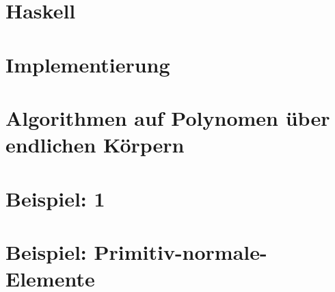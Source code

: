 \documentclass[ngerman
  ,fontsize=11pt %
  ,numbers=noenddot %
  ,parskip=half*
  ,openany
  ,DIV=10
  ,fleqn %
  ,oneside
  ,DIV=13
]{./myClass}
\begin{document}
\ifnum{}
  \frontmatter
  
  \newpage \thispagestyle{empty} \mbox{}
\else
  \mainmatter
\fi

\tableofcontents{}


\ifnum{}
  \mainmatter
\fi

%

\chapter{Haskell}


\chapter{Implementierung}








\chapter{Algorithmen auf Polynomen über endlichen Körpern}
\label{chap:algs}





\chapter{Beispiel: 1}
%
\chapter{Beispiel: Primitiv-normale-Elemente}



%

\pagebreak
\printbibliography

\appendix
{}



\end{document}
